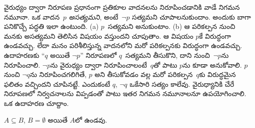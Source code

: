 \documentclass[../../../include/open-logic-section]{subfiles}
\begin{document}


వైరుధ్యం ద్వారా నిరూపణ ప్రధానంగా ప్రతికూల వాదనలను
నిరూపించడానికి వాడే నిగమన నమూనా. ఒక వాదన~$p$ \emph{అసత్యమని}, అంటే~$\lnot p$
సత్యమని చూపాలనుకుందాం. అందుకు బాగా పనికొచ్చే పద్ధతి ఇలా ఉంటుంది.
(a) $p$~సత్యమని అనుకుంటాం. (b) ఆ పరికల్పన నుంచి
మనకు అసత్యమని తెలిసిన విషయం వస్తుందని చూపుతాం.
ఆ విషయం $p$కే విరుద్ధంగా ఉండవచ్చు. లేదా మనం
పరిశీలిస్తున్న వాదనలోని మరో పరికల్పనకు విరుద్ధంగా ఉండవచ్చు. ఉదాహరణకు ``$q$ అయితే $\lnot p$'' నిరూపణలో $q$~సత్యమని తీసుకొని, దాని నుంచి~$\lnot
p$ను నిరూపించాలి. $\lnot p$ను వైరుధ్యం ద్వారా నిరూపించాలంటే~$q$తో పాటు $p$ను కూడా అనుకోవాలి. $p$ నుంచి $\lnot q$ను నిరూపించగలిగితే, $p$ అని తీసుకోవడం వల్ల మరో పరికల్పన~$q$కు విరుద్ధమైన ఫలితం వచ్చిందని చూపినట్టే. ఎందుకంటే $q$, $\lnot q$ ఒకేసారి సత్యం కాలేవు. వైరుధ్యానికి చేరే నిరూపణలో నిర్వచనాలను విప్పడంతో పాటు ఇతర నిగమన నమూనాలనూ ఉపయోగించాలి. ఒక ఉదాహరణ చూద్దాం.

\begin{prop}
  $A \subseteq B$, $B = \emptyset$ అయితే $A$లో  ఉండవు.
\end{prop}
\end{document}
